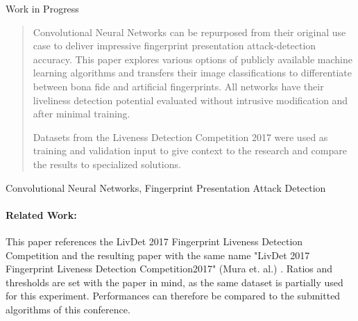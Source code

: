 
\begin{center}
\huge Work in Progress
\end{center}

\begin{abstract}
Convolutional Neural Networks can be repurposed from their original use case to deliver impressive fingerprint presentation attack-detection accuracy.
This paper explores various options of publicly available machine learning algorithms and transfers their image classifications to differentiate between bona fide and artificial fingerprints.
All networks have their liveliness detection potential evaluated without intrusive modification and after minimal training.

Datasets from the Liveness Detection Competition 2017 were used as training and validation input to give context to the research and compare the results to specialized solutions.
\end{abstract}


\begin{keywords}
Convolutional Neural Networks, Fingerprint Presentation Attack Detection
\end{keywords}


\paragraph{Related Work:}
This paper references the LivDet 2017 Fingerprint Liveness Detection Competition and the resulting paper with the same name "LivDet 2017 Fingerprint Liveness Detection Competition2017" (Mura et. al.) \cite{LIVDET}.
Ratios and thresholds are set with the paper in mind, as the same dataset is partially used for this experiment.
Performances can therefore be compared to the submitted algorithms of this conference.





